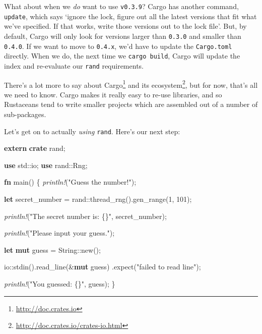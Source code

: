 \documentclass[a4paper,]{book}
\newenvironment{Shaded}{\begin{snugshade}}{\end{snugshade}}
\newcommand{\KeywordTok}[1]{\textcolor[rgb]{0.13,0.29,0.53}{\textbf{{#1}}}}
\newcommand{\DataTypeTok}[1]{\textcolor[rgb]{0.13,0.29,0.53}{{#1}}}
\newcommand{\DecValTok}[1]{\textcolor[rgb]{0.00,0.00,0.81}{{#1}}}
\newcommand{\StringTok}[1]{\textcolor[rgb]{0.31,0.60,0.02}{{#1}}}
\newcommand{\PreprocessorTok}[1]{\textcolor[rgb]{0.56,0.35,0.01}{\textit{{#1}}}}
\newcommand{\NormalTok}[1]{{#1}}
\renewcommand{\href}[2]{#2\footnote{\url{#1}}}
\begin{document}
What about when we \emph{do} want to use \texttt{v0.3.9}? Cargo has
another command, \texttt{update}, which says `ignore the lock, figure
out all the latest versions that fit what we've specified. If that
works, write those versions out to the lock file'. But, by default,
Cargo will only look for versions larger than \texttt{0.3.0} and smaller
than \texttt{0.4.0}. If we want to move to \texttt{0.4.x}, we'd have to
update the \texttt{Cargo.toml} directly. When we do, the next time we
\texttt{cargo\ build}, Cargo will update the index and re-evaluate our
\texttt{rand} requirements.

There's a lot more to say about \href{http://doc.crates.io}{Cargo} and
\href{http://doc.crates.io/crates-io.html}{its ecosystem}, but for now,
that's all we need to know. Cargo makes it really easy to re-use
libraries, and so Rustaceans tend to write smaller projects which are
assembled out of a number of sub-packages.

Let's get on to actually \emph{using} \texttt{rand}. Here's our next
step:

\begin{Shaded}
\begin{Highlighting}[]
\KeywordTok{extern} \KeywordTok{crate} \NormalTok{rand;}

\KeywordTok{use} \NormalTok{std::io;}
\KeywordTok{use} \NormalTok{rand::Rng;}

\KeywordTok{fn} \NormalTok{main() \{}
    \PreprocessorTok{println!}\NormalTok{(}\StringTok{"Guess the number!"}\NormalTok{);}

    \KeywordTok{let} \NormalTok{secret_number = rand::thread_rng().gen_range(}\DecValTok{1}\NormalTok{, }\DecValTok{101}\NormalTok{);}

    \PreprocessorTok{println!}\NormalTok{(}\StringTok{"The secret number is: \{\}"}\NormalTok{, secret_number);}

    \PreprocessorTok{println!}\NormalTok{(}\StringTok{"Please input your guess."}\NormalTok{);}

    \KeywordTok{let} \KeywordTok{mut} \NormalTok{guess = }\DataTypeTok{String}\NormalTok{::new();}

    \NormalTok{io::stdin().read_line(&}\KeywordTok{mut} \NormalTok{guess)}
        \NormalTok{.expect(}\StringTok{"failed to read line"}\NormalTok{);}

    \PreprocessorTok{println!}\NormalTok{(}\StringTok{"You guessed: \{\}"}\NormalTok{, guess);}
\NormalTok{\}}
\end{Highlighting}
\end{Shaded}
\end{document}
